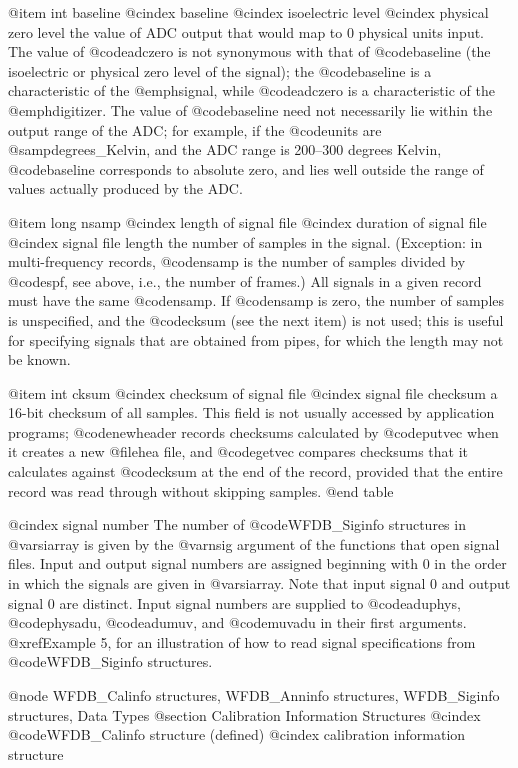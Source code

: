 {{{{{{{{{{@item int baseline
@cindex baseline
@cindex isoelectric level
@cindex physical zero level
the value of ADC output that would map to 0 physical units input.
The value of @code{adczero} is not synonymous with that of
@code{baseline} (the isoelectric or physical zero level of the signal);  the
@code{baseline} is a characteristic of the @emph{signal}, while
@code{adczero} is a characteristic of the @emph{digitizer}.  The value
of @code{baseline} need not necessarily lie within the output range of
the ADC;  for example, if the @code{units} are @samp{degrees_Kelvin},
and the ADC range is 200--300 degrees Kelvin, @code{baseline} corresponds to 
absolute zero, and lies well outside the range of values actually produced
by the ADC.

@item long nsamp
@cindex length of signal file
@cindex duration of signal file
@cindex signal file length
the number of samples in the signal.  (Exception: in multi-frequency records,
@code{nsamp} is the number of samples divided by @code{spf}, see above, i.e.,
the number of frames.)  All signals in a given record must have the same
@code{nsamp}.  If @code{nsamp} is zero, the number of samples is unspecified,
and the @code{cksum} (see the next item) is not used; this is useful for
specifying signals that are obtained from pipes, for which the length may not
be known.

@item int cksum
@cindex checksum of signal file
@cindex signal file checksum
a 16-bit checksum of all samples.  This field is not usually accessed by
application programs; @code{newheader} records checksums calculated by
@code{putvec} when it creates a new @file{hea} file, and
@code{getvec} compares checksums that it calculates against @code{cksum}
at the end of the record, provided that the entire record was read
through without skipping samples.
@end table

@cindex signal number
The number of @code{WFDB_Siginfo} structures in @var{siarray} is given by
the @var{nsig} argument of the functions that open signal files.  Input
and output signal numbers are assigned beginning with 0 in the order in
which the signals are given in @var{siarray}.  Note that input signal 0
and output signal 0 are distinct.  Input signal numbers are supplied to
@code{aduphys}, @code{physadu}, @code{adumuv}, and @code{muvadu} in
their first arguments.  @xref{Example 5}, for an illustration of how to
read signal specifications from @code{WFDB_Siginfo} structures.

@node WFDB_Calinfo structures, WFDB_Anninfo structures, WFDB_Siginfo structures, Data Types
@section Calibration Information Structures
@cindex @code{WFDB_Calinfo} structure (defined)
@cindex calibration information structure

}}}}}}}}}}
